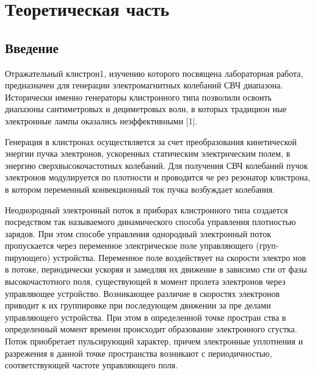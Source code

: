 
\usepackage{gensymb}
\usepackage{textcomp}
\usepackage{pythontex}


\def\labauthors{Карусевич А.А, Понур К.А.}
\def\labgroup{430}
\def\department{Кафедра электродинамики}
\def\labnumber{1}
\def\labtheme{Исследование отражательного клистрона}

\renewcommand{\Re}{\operatorname{Re}}
\renewcommand{\Im}{\operatorname{Im}}
\renewcommand{\phi}{\varphi}
\renewcommand{\hat}{\widehat}


\tableofcontents
\newpage

\section{Теоретическая часть}
\subsection{Введение}
Отражательный клистрон1, изучению которого посвящена лабораторная
работа, предназначен для генерации электромагнитных колебаний СВЧ диа­пазона. Исторически именно генераторы клистронного типа позволили осво­ить диапазоны сантиметровых и дециметровых волн, в которых традицион­
ные электронные лампы оказались неэффективными [1|.

Генерация в клистронах осуществляется за счет преобразования кинети­ческой энергии пучка электронов, ускоренных статическим электрическим
полем, в энергию сверхвысокочастотных колебаний. Для получения СВЧ
колебаний пучок электронов модулируется по плотности и проводится че­
рез резонатор клистрона, в котором переменный конвекционный ток пучка
возбуждает колебания.

Неоднородный электронный поток в приборах клистронного типа созда­ется посредством так называемого динамического способа управления плот­ностью зарядов. При этом способе управления однородный электронный по­ток пропускается через переменное электрическое поле управляющего 
(груп­пирующего) устройства. Переменное поле воздействует на скорости электро­
нов в потоке, периодически ускоряя и замедляя их движение в зависимо­
сти от фазы высокочастотного поля, существующей в момент пролета элек­тронов через управляющее устройство. Возникающее различие в скоростях
электронов приводит к их группировке при последующем движении за пре­
делами управляющего устройства. При этом в определенной точке простран­
ства в определенный момент времени происходит образование электронного
сгустка. Поток приобретает пульсирующий характер, причем электронные
уплотнения и разрежения в данной точке пространства возникают с перио­дичностью, соответствующей частоте управляющего поля.

